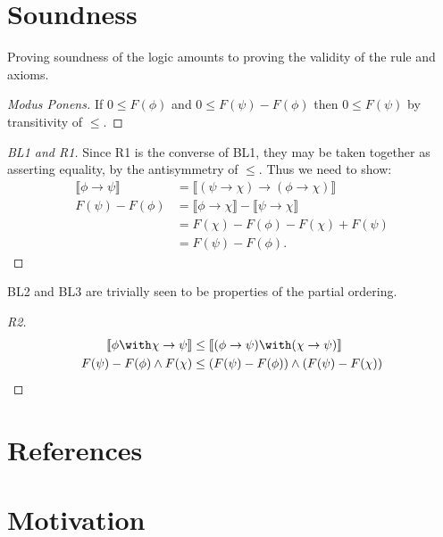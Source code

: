 \documentclass[preprint,leqno]{elsarticle}
\newcommand{\interp}[1]{\llbracket #1 \rrbracket}
\begin{document}
\section{Soundness}

Proving soundness of the logic amounts to proving the validity of the
rule and axioms.


\begin{proof}[Modus Ponens]
If $0 \le F(\phi)$ and $0 \le F(\psi) - F(\phi)$ then
$0 \le F(\psi)$ by transitivity of $\le$.
\end{proof}

\begin{proof}[BL1 and R1]
  Since R1 is the converse of BL1, they may be taken together as
  asserting equality, by the antisymmetry of $\le$. Thus we need to
  show:
  \begin{align*}
    \interp{\phi \rightarrow \psi} & = \interp{(\psi \rightarrow
      \chi) \rightarrow (\phi \rightarrow \chi)}\\
    F(\psi) - F(\phi) & = \interp{\phi \rightarrow \chi} -
    \interp{\psi \rightarrow \chi}\\
    & = F(\chi) - F(\phi) - F(\chi) + F(\psi)\\
    & = F(\psi) - F(\phi).
  \end{align*}
\end{proof}
BL2 and BL3 are trivially seen to be properties of the partial
ordering.

\begin{proof}[R2]
\begin{align*}
  \interp{\phi \with \chi \rightarrow \psi} &\le \interp{(\phi \rightarrow \psi) \with (\chi \rightarrow \psi)}\\
  F(\psi) - F(\phi)\land F(\chi) &\le (F(\psi) - F(\phi)) \land
  (F(\psi) - F(\chi))
\end{align*}
\end{proof}

\section*{References}





\section{Motivation}
\end{document}
